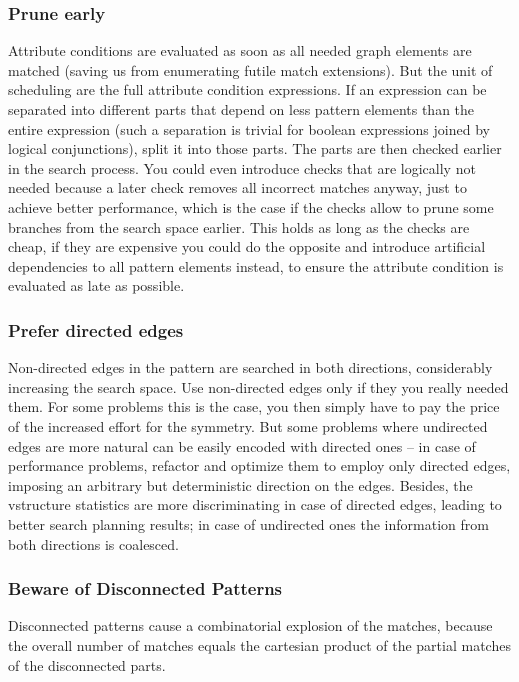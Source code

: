 \subsubsection*{Prune early}
Attribute conditions are evaluated as soon as all needed graph elements are matched (saving us from enumerating futile match extensions).
But the unit of scheduling are the full attribute condition expressions. 
If an expression can be separated into different parts that depend on less pattern elements than the entire expression (such a separation is trivial for boolean expressions joined by logical conjunctions), split it into those parts.
The parts are then checked earlier in the search process.
You could even introduce checks that are logically not needed because a later check removes all incorrect matches anyway, just to achieve better performance, which is the case if the checks allow to prune some branches from the search space earlier.
This holds as long as the checks are cheap, if they are expensive you could do the opposite and introduce artificial dependencies to all pattern elements instead, to ensure the attribute condition is evaluated as late as possible.


\subsubsection*{Prefer directed edges}
Non-directed edges in the pattern are searched in both directions, considerably increasing the search space.
Use non-directed edges only if they you really needed them.
For some problems this is the case, you then simply have to pay the price of the increased effort for the symmetry.
But some problems where undirected edges are more natural can be easily encoded with directed ones -- in case of performance problems, refactor and optimize them to employ only directed edges, imposing an arbitrary but deterministic direction on the edges.
Besides, the vstructure statistics are more discriminating in case of directed edges, leading to better search planning results; in case of undirected ones the information from both directions is coalesced.


\subsubsection*{Beware of Disconnected Patterns}
Disconnected patterns cause a combinatorial explosion of the matches, because the overall number of matches equals the cartesian product of the partial matches of the disconnected parts. 

